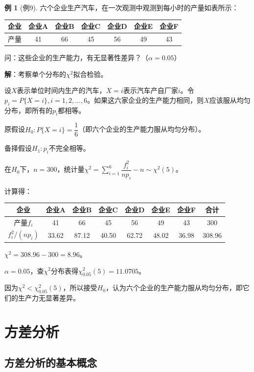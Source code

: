 \documentclass[11pt,a4paper]{report}
\theoremstyle{definition}
\newtheorem{example}{例}[chapter]
\theoremstyle{plain}
\begin{document}
\begin{example}[例9]
六个企业生产汽车，在一次观测中观测到每小时的产量如表所示：
\begin{center}
\begin{tabular}{ccccccc}
\toprule
企业 & 企业A & 企业B & 企业C & 企业D & 企业E & 企业F \\
\midrule
产量 & 41 & 66 & 45 & 56 & 49 & 43 \\
\bottomrule
\end{tabular}
\end{center}
问：这些企业的生产能力，有无显著性差异？（$\alpha=0.05$）

\textbf{解}：考察单个分布的$\chi^2$拟合检验。

设$X$表示单位时间内生产的汽车，$X=i$表示汽车产自厂家$i$。令$p_i=P\{X=i\},i=1,2,\ldots,6$。如果这六家企业的生产能力相同，则$X$应该服从均匀分布，即所有的$p_i$都相等。

原假设$H_0:P\{X=i\}=\dfrac{1}{6}$（即六个企业的生产能力服从均匀分布）。

备择假设$H_1:p_i$不完全相等。

在$H_0$下，$n=300$，统计量$\chi^2=\sum_{i=1}^{6}\dfrac{f_i^2}{np_i}-n\sim\chi^2(5)$。

计算得：
\begin{center}
\begin{tabular}{cccccccc}
\toprule
企业 & 企业A & 企业B & 企业C & 企业D & 企业E & 企业F & 合计 \\
\midrule
产量$f_i$ & 41 & 66 & 45 & 56 & 49 & 43 & 300 \\
$f_i^2/(np_i)$ & 33.62 & 87.12 & 40.50 & 62.72 & 48.02 & 36.98 & 308.96 \\
\bottomrule
\end{tabular}
\end{center}

$\chi^2=308.96-300=8.96$。

$\alpha=0.05$，查$\chi^2$分布表得$\chi_{0.05}^2(5)=11.0705$。

因为$\chi^2<\chi_{0.05}^2(5)$，所以接受$H_0$，认为六个企业的生产能力服从均匀分布，即它们的生产力无显著差异。
\end{example}

\section{方差分析}

\subsection{方差分析的基本概念}
\end{document}
